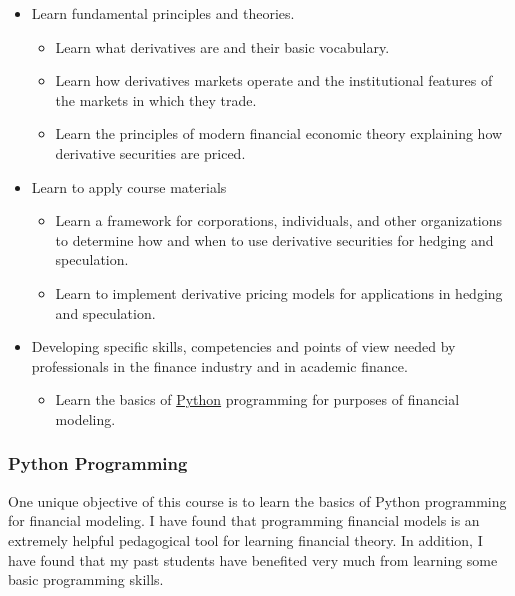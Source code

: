 \documentclass[]{article}
\begin{document}
\begin{itemize}
\itemsep1pt\parskip0pt
\item
  Learn fundamental principles and theories.

  \begin{itemize}
  \itemsep1pt\parskip0pt
  \item
    Learn what derivatives are and their basic vocabulary.
  \item
    Learn how derivatives markets operate and the institutional features
    of the markets in which they trade.
  \item
    Learn the principles of modern financial economic theory explaining
    how derivative securities are priced.
  \end{itemize}
\item
  Learn to apply course materials

  \begin{itemize}
  \itemsep1pt\parskip0pt
  \item
    Learn a framework for corporations, individuals, and other
    organizations to determine how and when to use derivative securities
    for hedging and speculation.
  \item
    Learn to implement derivative pricing models for applications in
    hedging and speculation.
  \end{itemize}
\item
  Developing specific skills, competencies and points of view needed by
  professionals in the finance industry and in academic finance.

  \begin{itemize}
  \itemsep1pt\parskip0pt
  \item
    Learn the basics of \href{https://www.python.org/}{Python}
    programming for purposes of financial modeling.
  \end{itemize}
\end{itemize}

\subsubsection{Python Programming}\label{python-programming}

One unique objective of this course is to learn the basics of Python
programming for financial modeling. I have found that programming
financial models is an extremely helpful pedagogical tool for learning
financial theory. In addition, I have found that my past students have
benefited very much from learning some basic programming skills.
\end{document}
